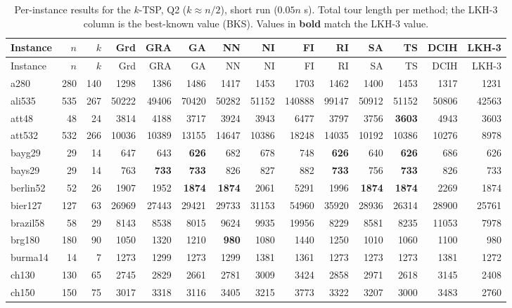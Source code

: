 {\footnotesize\setlength{\tabcolsep}{3pt}
\begin{longtable}{l r r r r r r r r r r r r r}
\caption{Per-instance results for the $k$-TSP, Q2 ($k\approx n/2$), short run ($0.05n$ s). Total tour length per method; the LKH-3 column is the best-known value (BKS). Values in \textbf{bold} match the LKH-3 value.}\label{tab:app_sr_medium}\\
\hline Instance & $n$ & $k$ & Grd & GRA & GA & NN & NI & FI & RI & SA & TS & DCIH & LKH-3 \\ \hline \endfirsthead
\hline Instance & $n$ & $k$ & Grd & GRA & GA & NN & NI & FI & RI & SA & TS & DCIH & LKH-3 \\ \hline \endhead
\hline \endfoot
a280 & 280 & 140 & 1298 & 1386 & 1486 & 1417 & 1453 & 1703 & 1462 & 1400 & 1453 & 1317 & 1231 \\
ali535 & 535 & 267 & 50222 & 49406 & 70420 & 50282 & 51152 & 140888 & 99147 & 50912 & 51152 & 50806 & 42563 \\
att48 & 48 & 24 & 3814 & 4188 & 3717 & 3924 & 3943 & 6477 & 3797 & 3756 & \textbf{3603} & 4943 & 3603 \\
att532 & 532 & 266 & 10036 & 10389 & 13155 & 14647 & 10386 & 18248 & 14035 & 10192 & 10386 & 10276 & 8978 \\
bayg29 & 29 & 14 & 647 & 643 & \textbf{626} & 682 & 678 & 748 & \textbf{626} & 640 & \textbf{626} & 686 & 626 \\
bays29 & 29 & 14 & 763 & \textbf{733} & \textbf{733} & 826 & 827 & 882 & \textbf{733} & 756 & \textbf{733} & 826 & 733 \\
berlin52 & 52 & 26 & 1907 & 1952 & \textbf{1874} & \textbf{1874} & 2061 & 5291 & 1996 & \textbf{1874} & \textbf{1874} & 2269 & 1874 \\
bier127 & 127 & 63 & 26969 & 27443 & 29421 & 29733 & 31153 & 54960 & 35920 & 28936 & 26314 & 28900 & 25761 \\
brazil58 & 58 & 29 & 8143 & 8538 & 8015 & 9624 & 9935 & 19956 & 8229 & 8581 & 8235 & 11053 & 7978 \\
brg180 & 180 & 90 & 1050 & 1320 & 1210 & \textbf{980} & 1080 & 1440 & 1250 & 1010 & 1060 & 1100 & 980 \\
burma14 & 14 & 7 & 1273 & 1299 & 1273 & 1299 & 1381 & 1361 & 1273 & 1273 & 1273 & 1381 & 1272 \\
ch130 & 130 & 65 & 2745 & 2829 & 2661 & 2781 & 3009 & 3424 & 2858 & 2971 & 2618 & 3145 & 2408 \\
ch150 & 150 & 75 & 3017 & 3318 & 3116 & 3405 & 3215 & 3773 & 3322 & 3207 & 3000 & 3483 & 2760 \\

\end{longtable}}

